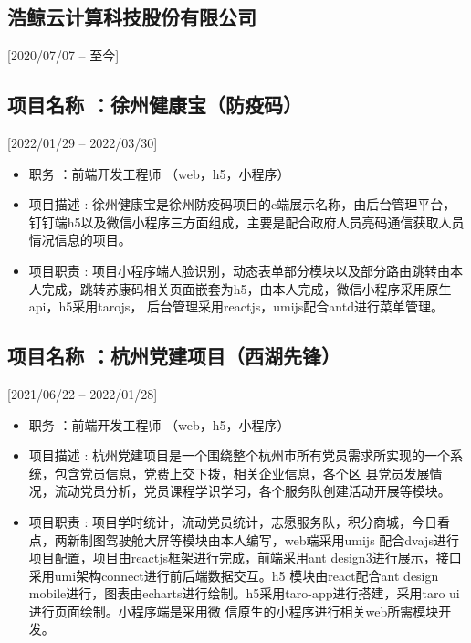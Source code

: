 \documentclass{mycv}
\begin{document}
\subsection{浩鲸云计算科技股份有限公司}[2020/07/07 – 至今]


\subsection{项目名称 ：徐州健康宝（防疫码）}[2022/01/29 – 2022/03/30]

\begin{itemize}
  \item 职务 ：前端开发工程师 （web，h5，小程序）
  \item 项目描述 : 徐州健康宝是徐州防疫码项目的c端展示名称，由后台管理平台，钉钉端h5以及微信小程序三方面组成，主要是配合政府人员亮码通信获取人员情况信息的项目。
  \item 项目职责 : 项目小程序端人脸识别，动态表单部分模块以及部分路由跳转由本人完成，跳转苏康码相关页面嵌套为h5，由本人完成，微信小程序采用原生api，h5采用tarojs，
        后台管理采用reactjs，umijs配合antd进行菜单管理。
\end{itemize}

\subsection{项目名称 ：杭州党建项目（西湖先锋）}[2021/06/22 – 2022/01/28]

\begin{itemize}
  \item 职务 ：前端开发工程师 （web，h5，小程序）
  \item 项目描述 : 杭州党建项目是一个围绕整个杭州市所有党员需求所实现的一个系统，包含党员信息，党费上交下拨，相关企业信息，各个区
        县党员发展情况，流动党员分析，党员课程学识学习，各个服务队创建活动开展等模块。
  \item 项目职责 : 项目学时统计，流动党员统计，志愿服务队，积分商城，今日看点，两新制图驾驶舱大屏等模块由本人编写，web端采用umijs
        配合dvajs进行项目配置，项目由reactjs框架进行完成，前端采用ant design3进行展示，接口采用umi架构connect进行前后端数据交互。h5
        模块由react配合ant design mobile进行，图表由echarts进行绘制。h5采用taro-app进行搭建，采用taro ui进行页面绘制。小程序端是采用微
        信原生的小程序进行相关web所需模块开发。
\end{itemize}
\end{document}
